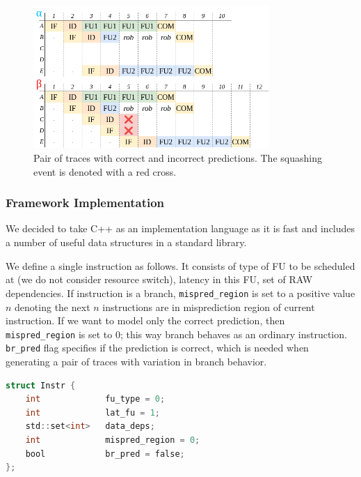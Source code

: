 \begin{figure}[H]
	\centering
	\includegraphics[width=0.8\textwidth]{figures/mispred-intro.png}
	\caption{Pair of traces with correct and incorrect predictions. The squashing event is denoted with a red cross.}
	\label{fig:mispred-intro}
\end{figure}



\subsubsection{Framework Implementation}

We decided to take C++ \cite{stroustrup_c_2015} as an implementation language as it is fast and includes a number of useful data structures in a standard library.


We define a single instruction as follows. It consists of type of FU to be scheduled at (we do not consider resource switch), latency in this FU, set of RAW dependencies. If instruction is a branch, \texttt{mispred\_region} is set to a positive value $n$ denoting the next $n$ instructions are in misprediction region of current instruction. If we want to model only the correct prediction, then \texttt{mispred\_region} is set to 0; this way branch behaves as an ordinary instruction. \texttt{br\_pred} flag specifies if the prediction is correct, which is needed when generating a pair of traces with variation in branch behavior.

\begin{lstlisting}[language=C]
struct Instr {
    int 			fu_type = 0;
    int 			lat_fu = 1;
    std::set<int> 	data_deps;
    int 			mispred_region = 0;
    bool 			br_pred = false;
};
\end{lstlisting}

